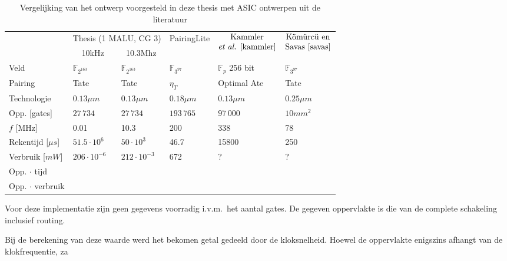 \begin{table}[h]
	\caption{Vergelijking van het ontwerp voorgesteld in deze thesis met ASIC ontwerpen uit de literatuur}
	\label{tabel-resultaten-asic}

	\begin{narrow}{-1cm}{-1cm}
		\centering
		\begin{tabular}{llllll}
			\toprule
			&	\multicolumn{2}{c}{Thesis (1 MALU, CG 3)}	& \multirow{2}{*}{PairingLite \cite{beuchat-asic}}	& \multicolumn{1}{c}{\multirow{2}{*}{$\begin{array}{@{}c@{}}\text{Kammler}\\\text{\emph{et al.} \cite{kammler}}\end{array}$}}	&  \multicolumn{1}{c}{\multirow{2}{*}{$\begin{array}{@{}c@{}}\text{K\"om\"urc\"u en}\\\text{Savas \cite{savas}}\end{array}$}}\\
			\cmidrule(r){2-3}
			& \multicolumn{1}{c}{10kHz} & \multicolumn{1}{c}{10.3Mhz} & & &\\
	 		\midrule
			Veld							& $\mathbb{F}_{2^{163}}$	& $\mathbb{F}_{2^{163}}$	& $\mathbb{F}_{3^{97}}$	& $\mathbb{F}_{p}$ 256 bit	& $\mathbb{F}_{3^{97}}$ \\
			Pairing						& Tate							& Tate							& $\eta_T$					& Optimal Ate 					& Tate\\
			Technologie					& $0.13 \mu m$					& $0.13 \mu m$					& $0.18 \mu m$				& $0.13 \mu m$					& $0.25 \mu m$\\
			Opp. [gates]				& $27\,734$						& $27\,734$						& $193\,765$				& $97\,000$						& \emph{$10mm^2$}\footnotemark[2]\\
			$f$ [MHz]					& 0.01							& 10.3							& 200							& 338								& 78\\
			Rekentijd [$\mu s$]		& $51.5 \cdot 10^6$			& $50 \cdot 10^3$				& 46.7						& 15800							& 250\\
			Verbruik [$mW$]			& $206 \cdot 10^{-6}$		& $212 \cdot 10^{-3}$		& 672							& ?								& ?\\
			Opp. $\cdot$ tijd\footnotemark[3]			& \\
			Opp. $\cdot$ verbruik	& \\
			\bottomrule		
		\end{tabular}
	\end{narrow}
		
	\raggedright \footnotesize \footnotemark[2] Voor deze implementatie zijn geen gegevens voorradig i.v.m.\ het aantal gates. De gegeven oppervlakte is die van de complete schakeling inclusief routing.
	
	\footnotemark[3] Bij de berekening van deze waarde werd het bekomen getal gedeeld door de kloksnelheid. Hoewel de oppervlakte enigszins afhangt van de klokfrequentie, za
\end{table}
